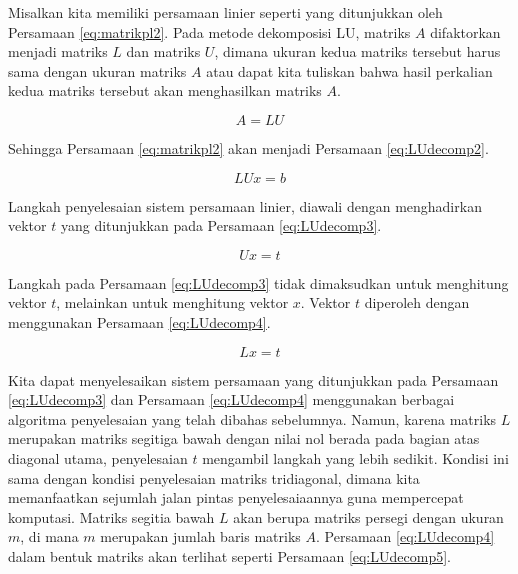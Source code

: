 \documentclass[]{book}
\theoremstyle{definition}
\theoremstyle{definition}
\theoremstyle{definition}
\theoremstyle{remark}
\begin{document}
Misalkan kita memiliki persamaan linier seperti yang ditunjukkan oleh Persamaan \eqref{eq:matrikpl2}. Pada metode dekomposisi LU, matriks \(A\) difaktorkan menjadi matriks \(L\) dan matriks \(U\), dimana ukuran kedua matriks tersebut harus sama dengan ukuran matriks \(A\) atau dapat kita tuliskan bahwa hasil perkalian kedua matriks tersebut akan menghasilkan matriks \(A\).

\begin{equation}
A=LU
 \label{eq:LUdecomp}
\end{equation}

Sehingga Persamaan \eqref{eq:matrikpl2} akan menjadi Persamaan \eqref{eq:LUdecomp2}.

\begin{equation}
LUx=b
 \label{eq:LUdecomp2}
\end{equation}

Langkah penyelesaian sistem persamaan linier, diawali dengan menghadirkan vektor \(t\) yang ditunjukkan pada Persamaan \eqref{eq:LUdecomp3}.

\begin{equation}
Ux=t
 \label{eq:LUdecomp3}
\end{equation}

Langkah pada Persamaan \eqref{eq:LUdecomp3} tidak dimaksudkan untuk menghitung vektor \(t\), melainkan untuk menghitung vektor \(x\). Vektor \(t\) diperoleh dengan menggunakan Persamaan \eqref{eq:LUdecomp4}.

\begin{equation}
Lx=t
 \label{eq:LUdecomp4}
\end{equation}

Kita dapat menyelesaikan sistem persamaan yang ditunjukkan pada Persamaan \eqref{eq:LUdecomp3} dan Persamaan \eqref{eq:LUdecomp4} menggunakan berbagai algoritma penyelesaian yang telah dibahas sebelumnya. Namun, karena matriks \(L\) merupakan matriks segitiga bawah dengan nilai nol berada pada bagian atas diagonal utama, penyelesaian \(t\) mengambil langkah yang lebih sedikit. Kondisi ini sama dengan kondisi penyelesaian matriks tridiagonal, dimana kita memanfaatkan sejumlah jalan pintas penyelesaiaannya guna mempercepat komputasi. Matriks segitia bawah \(L\) akan berupa matriks persegi dengan ukuran \(m\), di mana \(m\) merupakan jumlah baris matriks \(A\). Persamaan \eqref{eq:LUdecomp4} dalam bentuk matriks akan terlihat seperti Persamaan \eqref{eq:LUdecomp5}.
\end{document}
